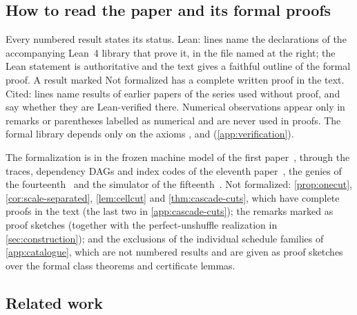 \subsection{How to read the paper and its formal proofs}

Every numbered result states its status. \textsf{Lean:} lines name the declarations of the accompanying Lean~4 library that
prove it, in the file named at the right; the Lean statement is authoritative and the text gives a faithful outline of the formal
proof. A result marked \textsf{Not formalized} has a complete written proof in the text. \textsf{Cited:} lines name results of
earlier papers of the series used without proof, and say whether they are Lean-verified there. Numerical observations appear
only in remarks or parentheses labelled as numerical and are never used in proofs. The formal library depends only on the axioms
,  and  (\cref{app:verification}).

The formalization is in the frozen machine model of the first paper~\cite{FirstPaper2026}, through the traces, dependency DAGs
and index codes of the eleventh paper~\cite{MergeDepth2026}, the genies of the fourteenth~\cite{BoundedStack2026} and the
simulator of the fifteenth~\cite{HighRate2026}. Not formalized: \cref{prop:onecut}, \cref{cor:scale-separated}, \cref{lem:cellcut} and \cref{thm:cascade-cuts}, which
have complete proofs in the text (the last two in \cref{app:cascade-cuts}); the remarks marked as proof sketches (together with the perfect-unshuffle realization in
\cref{sec:construction}); and the exclusions of the individual schedule families of
\cref{app:catalogue}, which are not numbered results and are given as proof sketches over the formal class theorems and certificate
lemmas.

\subsection{Related work}

